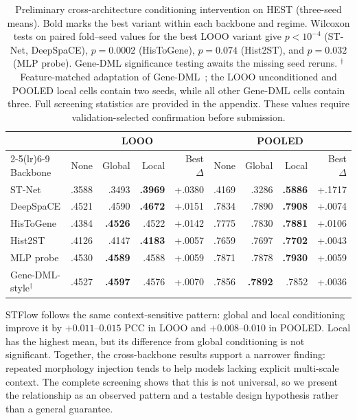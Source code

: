 \begin{table}[t]
\centering\small
\setlength{\tabcolsep}{4.2pt}
\begin{tabular}{lrrrrrrrr}
\toprule
& \multicolumn{4}{c}{LOOO} & \multicolumn{4}{c}{POOLED}\\
\cmidrule(lr){2-5}\cmidrule(lr){6-9}
Backbone & None & Global & Local & Best $\Delta$ & None & Global & Local & Best $\Delta$\\
\midrule
ST-Net & .3588 & .3493 & \textbf{.3969} & +.0380 & .4169 & .3286 & \textbf{.5886} & +.1717\\
DeepSpaCE & .4521 & .4590 & \textbf{.4672} & +.0151 & .7834 & .7890 & \textbf{.7908} & +.0074\\
HisToGene & .4384 & \textbf{.4526} & .4522 & +.0142 & .7775 & .7830 & \textbf{.7881} & +.0106\\
Hist2ST & .4126 & .4147 & \textbf{.4183} & +.0057 & .7659 & .7697 & \textbf{.7702} & +.0043\\
MLP probe & .4530 & \textbf{.4589} & .4588 & +.0059 & .7871 & .7878 & \textbf{.7930} & +.0059\\
Gene-DML-style$^\dagger$ & .4527 & \textbf{.4597} & .4576 & +.0070 & .7856 & \textbf{.7892} & .7852 & +.0036\\
\bottomrule
\end{tabular}
\caption{Preliminary cross-architecture conditioning intervention on HEST (three-seed means). Bold
marks the best variant within each backbone and regime. Wilcoxon tests on paired fold--seed values for
the best LOOO variant give $p<10^{-4}$ (ST-Net, DeepSpaCE), $p=0.0002$ (HisToGene), $p=0.074$
(Hist2ST), and $p=0.032$ (MLP probe). Gene-DML significance testing awaits the missing seed reruns.
$^\dagger$Feature-matched adaptation of Gene-DML~\cite{genedml}; the LOOO unconditioned and POOLED
local cells contain two seeds, while all other Gene-DML cells contain three. Full screening statistics
are provided in the appendix.
These values require validation-selected confirmation before submission.}
\label{tab:film_general}
\end{table}

STFlow follows the same context-sensitive pattern: global and local conditioning improve it by
$+0.011$--$0.015$ PCC in LOOO and $+0.008$--$0.010$ in POOLED. Local has the highest mean, but its
difference from global conditioning is not significant. Together, the cross-backbone results support
a narrower finding: repeated morphology injection tends to help models lacking explicit multi-scale
context. The complete screening shows that this is not universal, so we present the relationship as
an observed pattern and a testable design hypothesis rather than a general guarantee.

